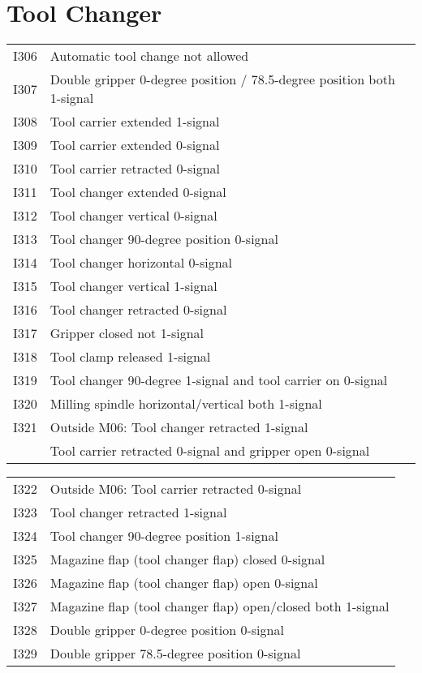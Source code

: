 \documentclass[openany,11pt]{book}
\begin{document}
\section*{Tool Changer}

\begin{table}[!h]
    \begin{tabular}{ll}
    I306 & Automatic tool change not allowed \\
    I307 & Double gripper 0-degree position / 78.5-degree position both 1-signal \\
    I308 & Tool carrier extended 1-signal \\
    I309 & Tool carrier extended 0-signal \\
    I310 & Tool carrier retracted 0-signal \\
    I311 & Tool changer extended 0-signal \\
    I312 & Tool changer vertical 0-signal \\
    I313 & Tool changer 90-degree position 0-signal \\
    I314 & Tool changer horizontal 0-signal \\
    I315 & Tool changer vertical 1-signal \\
    I316 & Tool changer retracted 0-signal \\
    I317 & Gripper closed not 1-signal \\
    I318 & Tool clamp released 1-signal \\
    I319 & Tool changer 90-degree 1-signal and tool carrier on 0-signal \\
    I320 & Milling spindle horizontal/vertical both 1-signal \\
    I321 & Outside M06: Tool changer retracted 1-signal \\
    & Tool carrier retracted 0-signal and gripper open 0-signal \\
    \end{tabular}
\end{table}

\newpage

\begin{table}[!h]
    \begin{tabular}{ll}
    I322 & Outside M06: Tool carrier retracted 0-signal \\
    I323 & Tool changer retracted 1-signal \\
    I324 & Tool changer 90-degree position 1-signal \\
    I325 & Magazine flap (tool changer flap) closed 0-signal \\
    I326 & Magazine flap (tool changer flap) open 0-signal \\
    I327 & Magazine flap (tool changer flap) open/closed both 1-signal \\
    I328 & Double gripper 0-degree position 0-signal \\
    I329 & Double gripper 78.5-degree position 0-signal \\
    \end{tabular}
\end{table}
\end{document}
